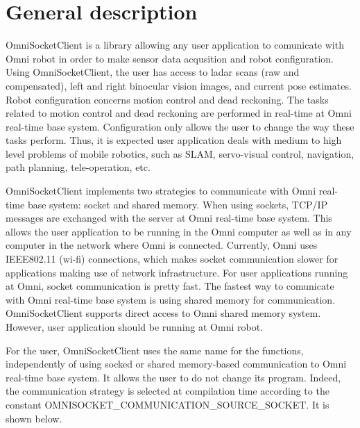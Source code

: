 \hypertarget{main_gen_desc_sec}{}\section{General description}\label{main_gen_desc_sec}
OmniSocketClient is a library allowing any user application to comunicate with Omni robot in order to make sensor data acqusition and robot configuration. Using OmniSocketClient, the user has access to ladar scans (raw and compensated), left and right binocular vision images, and current pose estimates. Robot configuration concerns motion control and dead reckoning. The tasks related to motion control and dead reckoning are performed in real-\/time at Omni real-\/time base system. Configuration only allows the user to change the way these tasks perform. Thus, it is expected user application deals with medium to high level problems of mobile robotics, such as SLAM, servo-\/visual control, navigation, path planning, tele-\/operation, etc.

OmniSocketClient implements two strategies to communicate with Omni real-\/time base system: socket and shared memory. When using sockets, TCP/IP messages are exchanged with the server at Omni real-\/time base system. This allows the user application to be running in the Omni computer as well as in any computer in the network where Omni is connected. Currently, Omni uses IEEE802.11 (wi-\/fi) connections, which makes socket communication slower for applications making use of network infrastructure. For user applications running at Omni, socket communication is pretty fast. The fastest way to comunicate with Omni real-\/time base system is using shared memory for communication. OmniSocketClient supports direct access to Omni shared memory system. However, user application should be running at Omni robot.

For the user, OmniSocketClient uses the same name for the functions, independently of using socked or shared memory-\/based communication to Omni real-\/time base system. It allows the user to do not change its program. Indeed, the communication strategy is selected at compilation time according to the constant OMNISOCKET\_\-COMMUNICATION\_\-SOURCE\_\-SOCKET. It is shown below.

